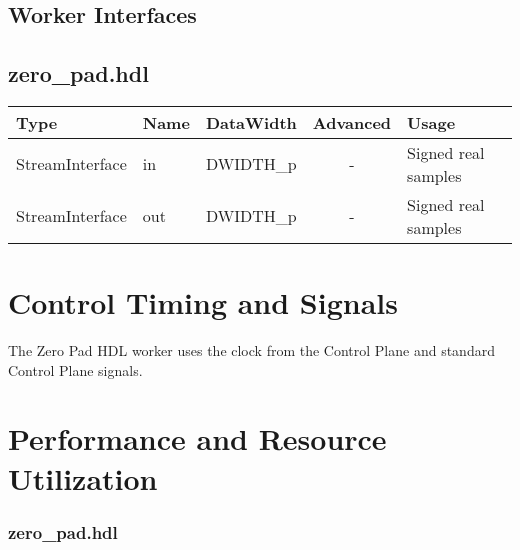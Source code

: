 \documentclass{article}
\def\comp{zero\_pad}
\edef\ecomp{zero_pad}
\def\Comp{Zero Pad}
\begin{document}
\begin{landscape}
	\section*{Worker Interfaces}
	\subsection*{\comp.hdl}
	\begin{scriptsize}
		\begin{tabular}{|M{2cm}|M{1.5cm}|c|c|p{12cm}|}
			\hline
			Type            & Name & DataWidth 		& Advanced  & Usage                 \\
			\hline
			StreamInterface & in   & DWIDTH\_p		& - 		& Signed real samples 	\\
			\hline
			StreamInterface & out  & DWIDTH\_p		& -			& Signed real samples 	\\
			\hline
		\end{tabular}
	\end{scriptsize}
\end{landscape}

\section*{Control Timing and Signals}
\begin{flushleft}
	The \Comp{} HDL worker uses the clock from the Control Plane and standard Control Plane signals.\\
\end{flushleft}

\section*{Performance and Resource Utilization}
\subsubsection*{\comp.hdl}

\end{document}
